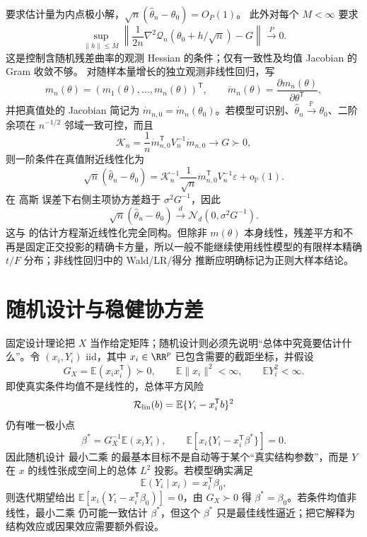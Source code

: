 \begin{theorem}[非线性最小二乘的局部渐近表示]

要求估计量为内点极小解，$\sqrt n(\widehat\theta_n-\theta_0)=O_P(1)$。
此外对每个 $M<\infty$ 要求
\[
 \sup_{\|h\|\le M}\left\|\frac1{2n}\nabla^2\mathcal Q_n(\theta_0+h/\sqrt n)-G\right\|
 \xrightarrow{P}0.
\]
这是控制含随机残差曲率的观测 Hessian 的条件；仅有一致性及均值 Jacobian 的 Gram 收敛不够。
对随样本量增长的独立观测非线性回归，写
\[
 m_n(\theta)=(m_1(\theta),\ldots,m_n(\theta))^{\mathsf T},
 \qquad
 \dot m_n(\theta)
 =\frac{\partial m_n(\theta)}{\partial\theta^{\mathsf T}},
\]
并把真值处的 Jacobian 简记为 $\dot m_{n,0}=\dot m_n(\theta_0)$。若模型可识别、$\widehat\theta_n\xrightarrow{\mathbb P}\theta_0$、二阶余项在 $n^{-1/2}$ 邻域一致可控，而且
\[
 \mathcal K_n=\frac1n\dot m_{n,0}^{\mathsf T}V_n^{-1}\dot m_{n,0}
 \longrightarrow G\succ0,
\]
则一阶条件在真值附近线性化为
\[
 \sqrt n(\widehat\theta_n-\theta_0)
 =\mathcal K_n^{-1}
 \frac1{\sqrt n}\dot m_{n,0}^{\mathsf T}V_n^{-1}\varepsilon
 +o_{\mathbb P}(1).
\]
在 高斯 误差下右侧主项协方差趋于 $\sigma^2G^{-1}$，因此
\[
 \sqrt n(\widehat\theta_n-\theta_0)
 \xrightarrow{d}\mathcal N_d(0,\sigma^2G^{-1}).
\]
这与  的估计方程渐近线性化完全同构。但除非 $m(\theta)$ 本身线性，残差平方和不再是固定正交投影的精确卡方量，所以一般不能继续使用线性模型的有限样本精确 $t/F$ 分布；非线性回归中的 Wald/LR/得分 推断应明确标记为正则大样本结论。
\end{theorem}

\section{随机设计与稳健协方差}

\begin{proposition}[随机设计的总体线性投影]
固定设计理论把 $X$ 当作给定矩阵；随机设计则必须先说明“总体中究竟要估计什么”。令 $(x_i,Y_i)$ iid，其中 $x_i\in\RR^p$ 已包含需要的截距坐标，并假设
\[
 G_X=\mathbb E(x_ix_i^{\mathsf T})\succ0,
 \qquad
 \mathbb E\|x_i\|^2<\infty,
 \qquad
 \mathbb E Y_i^2<\infty.
\]
即使真实条件均值不是线性的，总体平方风险
\[
 \mathcal R_{\rm lin}(b)=\mathbb E\{Y_i-x_i^{\mathsf T}b\}^2
\]
仍有唯一极小点
\begin{equation}\label{eq:math-stat-population-linear-projection}
 \beta^*
 =G_X^{-1}\mathbb E(x_iY_i),
 \qquad
 \mathbb E\!
 \left[x_i\{Y_i-x_i^{\mathsf T}\beta^*\}\right]=0.
\end{equation}
因此随机设计 最小二乘 的最基本目标不是自动等于某个“真实结构参数”，而是 $Y$ 在 $x$ 的线性张成空间上的总体 $L^2$ 投影。若模型确实满足
\[
 \mathbb E(Y_i\mid x_i)=x_i^{\mathsf T}\beta_0,
\]
则迭代期望给出 $\mathbb E[x_i(Y_i-x_i^{\mathsf T}\beta_0)]=0$，由 $G_X\succ0$ 得 $\beta^*=\beta_0$。若条件均值非线性，最小二乘 仍可能一致估计 $\beta^*$，但这个 $\beta^*$ 只是最佳线性逼近；把它解释为结构效应或因果效应需要额外假设。
\end{proposition}

